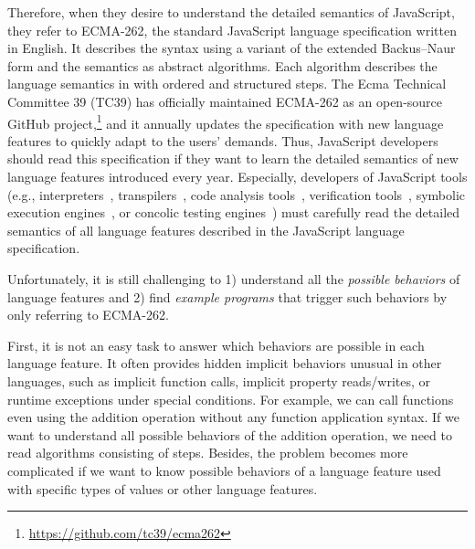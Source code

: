 Therefore, when they desire to understand the detailed semantics of JavaScript,
they refer to ECMA-262, the standard JavaScript language specification written
in English.  It describes the syntax using a variant of the extended Backus–Naur
form and the semantics as abstract algorithms.  Each algorithm describes the
language semantics in with ordered and structured steps.  The Ecma Technical
Committee 39 (TC39) has officially maintained ECMA-262 as an open-source GitHub
project,\footnote{\url{https://github.com/tc39/ecma262}} and it annually updates
the specification with new language features to quickly adapt to the users'
demands.  Thus, JavaScript developers should read this specification if they
want to learn the detailed semantics of new language features introduced every
year.  Especially, developers of JavaScript tools (e.g.,
interpreters~\cite{v8, jscore, spidermonkey, graaljs},
transpilers~\cite{babel},
code analysis tools~\cite{safe, safe2, tajs, wala, jsai},
verification tools~\cite{javert, javert2, ad-safety, javanni},
symbolic execution engines~\cite{symbolic-js, sym-js, expo-se},
or concolic testing engines~\cite{jalangi, type-conc-test})
must carefully read the detailed semantics of all language features described in
the JavaScript language specification.

Unfortunately, it is still challenging to 1) understand all the \textit{possible
behaviors} of language features and 2) find \textit{example programs} that
trigger such behaviors by only referring to ECMA-262.

First, it is not an easy task to answer which behaviors are possible in each
language feature.  It often provides hidden implicit behaviors unusual in other
languages, such as implicit function calls, implicit property reads/writes, or
runtime exceptions under special conditions.  For example, we can call functions
even using the addition operation without any function application syntax.  If
we want to understand all possible behaviors of the addition operation, we need
to read  algorithms consisting of  steps.  Besides, the
problem becomes more complicated if we want to know possible behaviors of a
language feature used with specific types of values or other language features.

